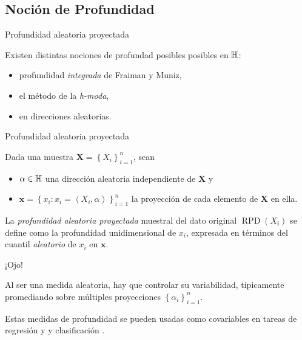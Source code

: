 \documentclass[10pt,spanish,handout]{beamer}\usepackage[]{graphicx}\usepackage[]{color}
\begin{document}
\subsection[Profundidad aleatoria]{Noción de Profundidad}
\begin{frame}{Profundidad aleatoria proyectada}

Existen distintas nociones de profundad posibles posibles en $\mathbb{H}$:

\pause{}
\begin{itemize}
\item profundidad \emph{integrada} de Fraiman y Muniz,
\end{itemize}

\pause{}
\begin{itemize}
\item el método de la \emph{h-moda},
\end{itemize}

\pause{}
\begin{itemize}
\item en direcciones aleatorias.
\end{itemize}
\end{frame}
%
\begin{frame}{Profundidad aleatoria proyectada}

Dada una muestra $\mathbf{X}=\left\{ X_{i}\right\} _{i=1}^{n}$, sean
\begin{itemize}
\item $\alpha\in\mathbb{H}$ una dirección aleatoria independiente de $\mathbf{X}$
y
\end{itemize}

\pause{}
\begin{itemize}
\item $\mathbf{x}=\left\{ x_{i}:x_{i}=\left\langle X_{i},\alpha\right\rangle \right\} _{i=1}^{n}$
la proyección de cada elemento de $\mathbf{X}$ en ella.
\end{itemize}

\pause{}

La \emph{profundidad aleatoria proyectada }muestral del dato original
$\mathop{RPD}\left(X_{i}\right)$ se define como la profundidad unidimensional
de $x_{i}$, expresada en términos del cuantil \emph{aleatorio} de
$x_{i}$ en $\mathbf{x}$.

\pause{}
\begin{alertblock}{¡Ojo!}

Al ser una medida aleatoria, hay que controlar su variabilidad, típicamente
promediando sobre múltiples proyecciones $\left\{ \alpha_{i}\right\} _{i=1}^{n}$.
\end{alertblock}

\pause{}

Estas medidas de profundidad se pueden usadas como covariables en
tareas de regresión \cite{Cuevas 2007} y y clasificación \cite{Cuevas 2007,Cuesta 2017}.
\end{frame}
\end{document}
